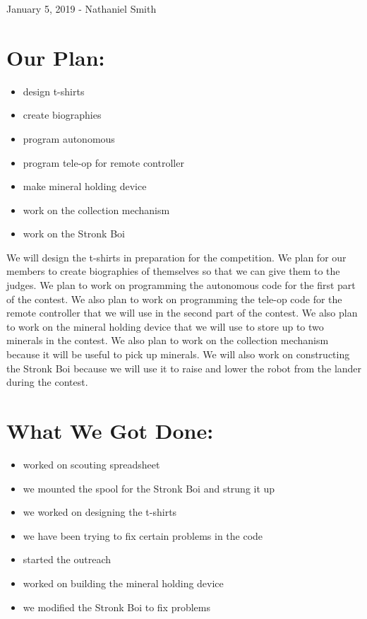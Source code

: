 \documentclass[12pt]{article}
\begin{document}
January 5, 2019 - Nathaniel Smith

\section{Our Plan:} %
\begin{itemize}
	\item design t-shirts
\item create biographies
\item program autonomous
\item program tele-op for remote controller
\item make mineral holding device
\item work on the collection mechanism
\item work on the Stronk Boi
\end{itemize}

We will design the t-shirts in preparation for the competition. We plan for our members to create biographies of themselves so that we can give them to the judges. We plan to work on programming the autonomous code for the first part of the contest. We also plan to work on programming the tele-op code for the remote controller that we will use in the second part of the contest. We also plan to work on the mineral holding device that we will use to store up to two minerals in the contest. We also plan to work on the collection mechanism because it will be useful to pick up minerals. We will also work on constructing the Stronk Boi because we will use it to raise and lower the robot from the lander during the contest.

\section{What We Got Done:} %
\begin{itemize}
	\item worked on scouting spreadsheet
\item we mounted the spool for the Stronk Boi and strung it up
\item we worked on designing the t-shirts
\item we have been trying to fix certain problems in the code
\item started the outreach
\item worked on building the mineral holding device
\item we modified the Stronk Boi to fix problems
\end{itemize}
\end{document}
